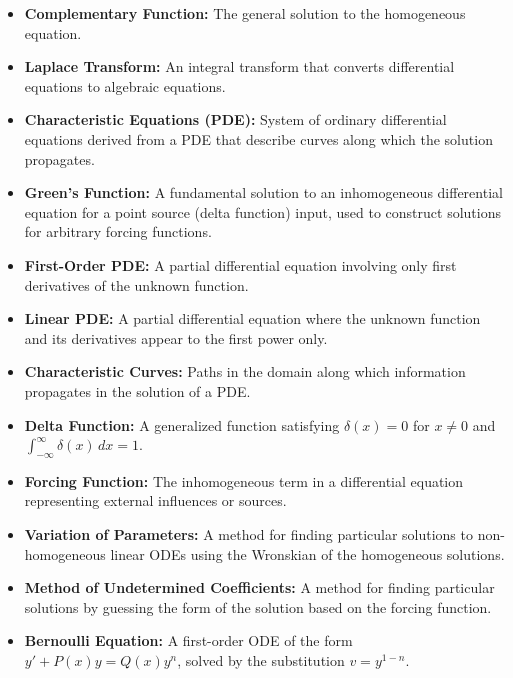 \begin{itemize}
    \item \textbf{Complementary Function:} The general solution to the homogeneous equation.
    
    \item \textbf{Laplace Transform:} An integral transform that converts differential equations to algebraic equations.

    \item \textbf{Characteristic Equations (PDE):} System of ordinary differential equations derived from a PDE that describe curves along which the solution propagates.
    
    \item \textbf{Green's Function:} A fundamental solution to an inhomogeneous differential equation for a point source (delta function) input, used to construct solutions for arbitrary forcing functions.
    
    \item \textbf{First-Order PDE:} A partial differential equation involving only first derivatives of the unknown function.
    
    \item \textbf{Linear PDE:} A partial differential equation where the unknown function and its derivatives appear to the first power only.
    
    \item \textbf{Characteristic Curves:} Paths in the domain along which information propagates in the solution of a PDE.
    
    \item \textbf{Delta Function:} A generalized function satisfying $\delta(x) = 0$ for $x \neq 0$ and $\int_{-\infty}^{\infty} \delta(x) \, dx = 1$.
    
    \item \textbf{Forcing Function:} The inhomogeneous term in a differential equation representing external influences or sources.

    \item \textbf{Variation of Parameters:} A method for finding particular solutions to non-homogeneous linear ODEs using the Wronskian of the homogeneous solutions.

    \item \textbf{Method of Undetermined Coefficients:} A method for finding particular solutions by guessing the form of the solution based on the forcing function.

    \item \textbf{Bernoulli Equation:} A first-order ODE of the form \( y' + P(x)y = Q(x)y^n \), solved by the substitution \( v = y^{1-n} \).


\end{itemize}

